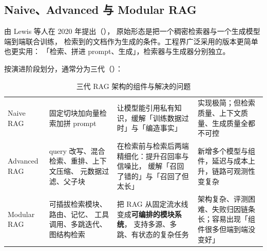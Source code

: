 \subsection{Naive、Advanced 与 Modular RAG}

 由 Lewis 等人在 2020 年提出（\cite{lewis2021rag}），
原始形态是把一个稠密检索器与一个生成模型端到端联合训练，
检索到的文档作为生成的条件。工程界广泛采用的版本更简单也更实用：
「检索、拼进 prompt、生成」，检索器与生成器分别独立。

按演进阶段划分，通常分为三代（\cite{gao2023ragsurvey}）：

\begin{table}[htbp]
\centering
\caption{三代 RAG 架构的组件与解决的问题}
\label{tab:rag-generations}
\small
\begin{tabularx}{\textwidth}{L{2.1cm} L{4.2cm} L{4.0cm} Y}
\toprule
{} &  &  &  \\
\midrule
Naive RAG & 固定切块加向量检索加拼 prompt &
让模型能引用私有知识，缓解「训练数据过时」与「编造事实」 &
实现极简；但检索质量、上下文质量、生成质量全都不可控 \\
\addlinespace
Advanced RAG & query 改写、混合检索、重排、上下文压缩、
元数据过滤、父子块 &
在检索前与检索后两端精细化：提升召回率与信噪比，
缓解「召回了错的」与「召回了但太长」 &
新增多个模型与组件，延迟与成本上升，链路可观测性变复杂 \\
\addlinespace
Modular RAG & 可插拔检索模块、路由、记忆、
工具调用、多跳迭代、图结构检索 &
把 RAG 从固定流水线变成\textbf{可编排的模块系统}，
支持多源、多跳、有状态的复杂任务 &
架构复杂、评测困难、失败归因链条长；容易出现「组件很多但端到端没变好」 \\
\bottomrule
\end{tabularx}
\end{table}

